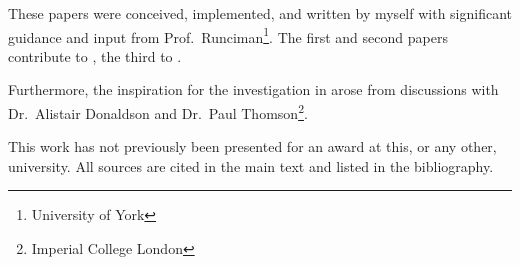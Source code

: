These papers were conceived, implemented, and written by myself with significant
guidance and input from Prof.~Runciman\footnote{University of York}.  The first
and second papers contribute to , the third to .

Furthermore, the inspiration for the investigation in  arose
from discussions with Dr.~Alistair Donaldson and Dr.~Paul
Thomson\footnote{Imperial College London}.

This work has not previously been presented for an award at this, or any other,
university.  All sources are cited in the main text and listed in the
bibliography.
